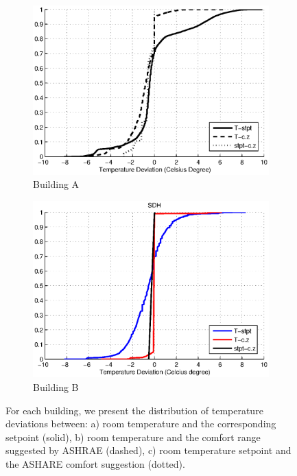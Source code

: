 \begin{figure}[h!]
\centering
	\begin{subfigure}{0.48\textwidth}
                \centering
		\includegraphics[width=\textwidth]{./figs/Soda_new.eps}
                \caption{Building A}
	\end{subfigure}
	\begin{subfigure}{0.48\textwidth}
                \centering
		\includegraphics[width=\textwidth]{./figs/SDH_new.eps}
                \caption{Building B}
	\end{subfigure}
\caption{For each building, we present the distribution of temperature deviations between: a) room temperature and the corresponding setpoint (solid), b) room temperature and the comfort range suggested by ASHRAE (dashed), c) room temperature setpoint and the ASHARE comfort suggestion (dotted).}
\label{fig:cdf_temp}
\end{figure}

